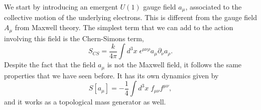 \documentclass{article}
\begin{document}
We start by introducing an emergent $U(1)$ gauge field $a_\mu$, associated to the collective motion of the underlying electrons. This is different from the gauge field $A_\mu$ from Maxwell theory. The simplest term that we can add to the action involving this field is the Chern-Simons term,
\begin{equation}
	S_{CS}=\frac{k}{4\pi}\int d^3x\;\epsilon^{\mu\nu\rho}a_\mu \partial_\nu a_\rho. 
\end{equation}
Despite the fact that the field $a_\mu$ is not the Maxwell field, it follows the same properties that we have seen before. It  has its own dynamics given by 
\begin{equation}
	S[a_\mu]=-\frac{1}{4}\int d^3x\;f_{\mu\nu}f^{\mu\nu},
\end{equation}
and it works as a topological mass generator as well. 
\end{document}
